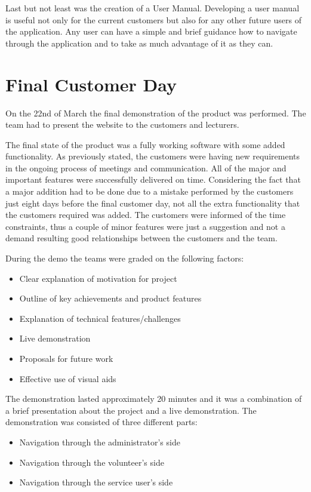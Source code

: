 \documentclass{l3proj}
\begin{document}
Last but not least was the creation of a User Manual. Developing a user manual is useful not only for the current customers but also for any other future users of the application. Any user can have a simple and brief guidance how to navigate through the application and to take as much advantage of it as they can.

\section{Final Customer Day}
\label{sec:finalDay}

On the 22nd of March the final demonstration of the product was performed. The team had to present the website to the customers and lecturers.

The final state of the product was a fully working software with some added functionality. As previously stated, the customers were having new requirements in the ongoing process of meetings and communication. All of the major and important features were successfully delivered on time. Considering the fact that a major addition had to be done due to a mistake performed by the customers just eight days before the final customer day, not all the extra functionality that the customers required was added. The customers were informed of the time constraints, thus a couple of minor features were just a suggestion and not a demand resulting good relationships between the customers and the team.

During the demo the teams were graded on the following factors:
\begin{itemize}
	\item Clear explanation of motivation for project
	\item Outline of key achievements and product features
	\item Explanation of technical features/challenges
	\item Live demonstration
	\item Proposals for future work
\item Effective use of visual aids
\end{itemize}
The demonstration lasted approximately 20 minutes and it was a combination of a brief presentation about the project and a live demonstration. The demonstration was consisted of three different parts:

\begin{itemize}
	\item Navigation through the administrator's side
	\item Navigation through the volunteer's side
	\item Navigation through the service user's side
\end{itemize}
\end{document}
